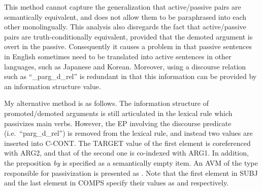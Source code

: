 \noindent This method cannot capture the generalization that
active/passive pairs are semantically equivalent, and does not allow
them to be paraphrased into each other monolingually. This analysis
also disregards the fact that active/passive pairs are
truth-conditionally equivalent, provided that the
demoted argument is overt in the passive. Consequently it
causes a problem in that passive sentences in English sometimes need
to be translated into active sentences in other languages, such as
Japanese and Korean. Moreover, using a discourse relation such as
``\_parg\_d\_rel'' is redundant in that this information can be provided
by an information structure value.



My alternative method is as follows. The information structure of
promoted/demoted arguments is still articulated in the lexical rule
which passivizes main verbs. However, the EP involving the discourse
predicate (i.e.\ ``parg\_d\_rel'') is removed from the lexical rule, and
instead two  values are inserted into
C-CONT. The TARGET value of the first element is
coreferenced with ARG2, and that of the second one is co-indexed with
ARG1.  In addition, the preposition \textit{by} is specified as a
semantically empty item. An AVM of the type responsible
for passivization is presented as . Note that the
first element in SUBJ and the last element in COMPS specify their
 values as  and 
respectively.






